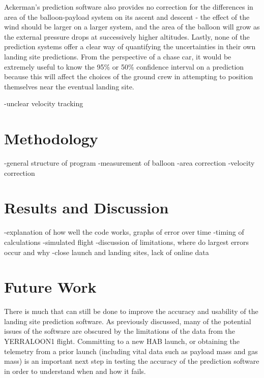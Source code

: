 \documentclass[11pt]{article}
\begin{document}
Ackerman's prediction software also provides no correction for the differences in area of the balloon-payload system on its ascent and descent - the effect of the wind should be larger on a larger system, and the area of the balloon will grow as the external pressure drops at successively higher altitudes. Lastly, none of the prediction systems offer a clear way of quantifying the uncertainties in their own landing site predictions. From the perspective of a chase car, it would be extremely useful to know the 95\% or 50\% confidence interval on a prediction because this will affect the choices of the ground crew in attempting to position themselves near the eventual landing site.

-unclear velocity tracking

\section{Methodology}

-general structure of program
-measurement of balloon
-area correction
-velocity correction


\section{Results and Discussion}

-explanation of how well the code works, graphs of error over time
-timing of calculations
-simulated flight
-discussion of limitations, where do largest errors occur and why
-close launch and landing sites, lack of online data

\section{Future Work}

There is much that can still be done to improve the accuracy and usability of the landing site prediction software. As previously discussed, many of the potential issues of the software are obscured by the limitations of the data from the YERRALOON1 flight. Committing to a new HAB launch, or obtaining the telemetry from a prior launch (including vital data such as payload mass and gas mass) is an important next step in testing the accuracy of the prediction software in order to understand when and how it fails. \\
\end{document}
